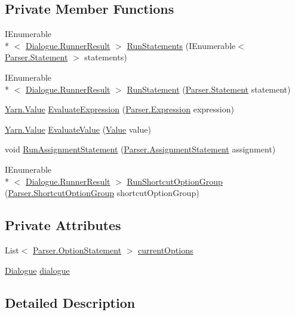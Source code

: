 \subsection*{Private Member Functions}
\begin{DoxyCompactItemize}
\item 
I\-Enumerable\\*
$<$ \hyperlink{a00069}{Dialogue.\-Runner\-Result} $>$ \hyperlink{a00083_aa436557ec45c8e98d194d9af139d9170}{Run\-Statements} (I\-Enumerable$<$ \hyperlink{a00076}{Parser.\-Statement} $>$ statements)
\item 
I\-Enumerable\\*
$<$ \hyperlink{a00069}{Dialogue.\-Runner\-Result} $>$ \hyperlink{a00083_a4a0f51fa1a54f8df77557cab086e43b7}{Run\-Statement} (\hyperlink{a00076}{Parser.\-Statement} statement)
\item 
\hyperlink{a00086}{Yarn.\-Value} \hyperlink{a00083_ac57271c72da4ec456a32c94d951c8b65}{Evaluate\-Expression} (\hyperlink{a00040}{Parser.\-Expression} expression)
\item 
\hyperlink{a00086}{Yarn.\-Value} \hyperlink{a00083_a352ca6c227f278419b252bc46ba30d0d}{Evaluate\-Value} (\hyperlink{a00086}{Value} value)
\item 
void \hyperlink{a00083_a217c6205821aff5ba31daeb8b3bf2846}{Run\-Assignment\-Statement} (\hyperlink{a00019}{Parser.\-Assignment\-Statement} assignment)
\item 
I\-Enumerable\\*
$<$ \hyperlink{a00069}{Dialogue.\-Runner\-Result} $>$ \hyperlink{a00083_a231488eace774d92f5c55034d075016d}{Run\-Shortcut\-Option\-Group} (\hyperlink{a00071}{Parser.\-Shortcut\-Option\-Group} shortcut\-Option\-Group)
\end{DoxyCompactItemize}
\subsection*{Private Attributes}
\begin{DoxyCompactItemize}
\item 
List$<$ \hyperlink{a00061}{Parser.\-Option\-Statement} $>$ \hyperlink{a00083_a1ff25426f4da4236acc741bbbb8c0d56}{current\-Options}
\item 
\hyperlink{a00036}{Dialogue} \hyperlink{a00083_aa4f386822db0dee7a07079271cb968a4}{dialogue}
\end{DoxyCompactItemize}


\subsection{Detailed Description}


